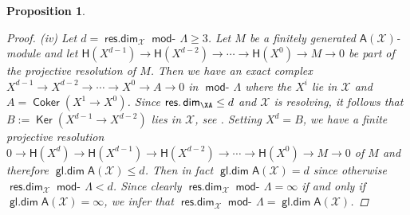 \documentclass[oneside, a4paper,reqno]{amsart}
\numberwithin{equation}{section}
\newtheorem{prop}[thm]{Proposition}
\theoremstyle{definition}
\begin{document}
\begin{prop}
\begin{proof}
(iv) Let $d = \operatorname*{\mathsf{res.dim}}_{\mathcal X}\operatorname*{\mathsf{mod}-\!}\Lambda \geq 3$.  Let $M$ be a finitely
generated $\mathsf{A}({\mathcal X})$-module and let $\mathsf{H}(X^{d-1}) {\longrightarrow}
\mathsf{H}(X^{d-2}) {\longrightarrow} \cdots {\longrightarrow} \mathsf{H}(X^{0}) {\longrightarrow} M {\longrightarrow}
0$ be part of the projective resolution of $M$. Then we have an
exact complex $X^{d-1} {\longrightarrow} X^{d-2} {\longrightarrow} \cdots  {\longrightarrow} X^{0} {\longrightarrow} A
{\longrightarrow} 0$ in $\operatorname*{\mathsf{mod}-\!}\Lambda$ where the $X^{i}$ lie in ${\mathcal X}$ and $A =
\operatorname*{\mathsf{Coker}}(X^{1}\to X^{0})$. Since $\operatorname*{\mathsf{res.dim}}_\XA \leq d$ and ${\mathcal X}$ is
resolving, it follows that $B := \operatorname*{\mathsf{Ker}}(X^{d-1}\to X^{d-2})$ lies in
${\mathcal X}$, see \cite{ABr}. Setting $X^{d} = B$, we have a finite
projective resolution $0 {\longrightarrow} \mathsf{H}(X^{d}) {\longrightarrow}
\mathsf{H}(X^{d-1}) {\longrightarrow} \mathsf{H}(X^{d-2}) {\longrightarrow} \cdots {\longrightarrow}
 \mathsf{H}(X^{0}) {\longrightarrow} M {\longrightarrow} 0$ of $M$ and
therefore $\operatorname*{\mathsf{gl.dim}}\mathsf{A}({\mathcal X}) \leq d$. Then in fact
$\operatorname*{\mathsf{gl.dim}}\mathsf{A}({\mathcal X}) = d$ since otherwise $\operatorname*{\mathsf{res.dim}}_{\mathcal X}\operatorname*{\mathsf{mod}-\!}\Lambda < d$.
Since clearly  $\operatorname*{\mathsf{res.dim}}_{\mathcal X}\operatorname*{\mathsf{mod}-\!}\Lambda = \infty$ if and only if
$\operatorname*{\mathsf{gl.dim}}\mathsf{A}({\mathcal X}) = \infty$, we infer that $\operatorname*{\mathsf{res.dim}}_{\mathcal X}\operatorname*{\mathsf{mod}-\!}\Lambda =
\operatorname*{\mathsf{gl.dim}}\mathsf{A}({\mathcal X})$.
\end{proof}
\end{prop}
\end{document}
